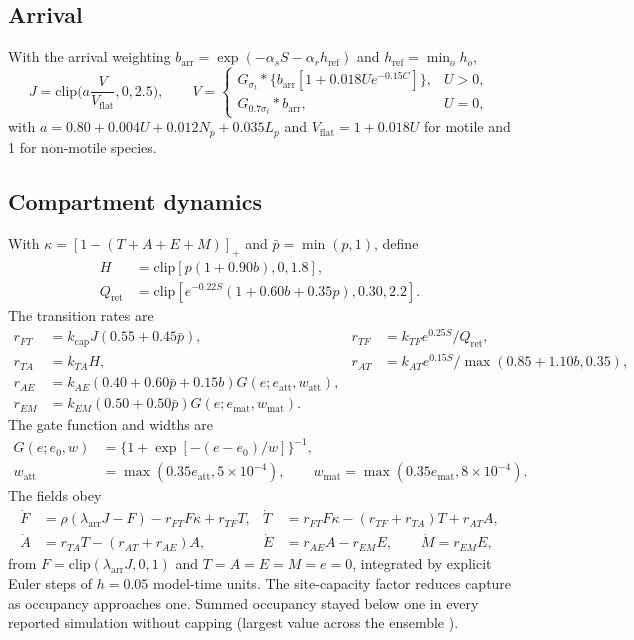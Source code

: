 \documentclass[11pt]{article}
\begin{document}
\subsection{Arrival}
With the arrival weighting $b_{\mathrm{arr}}=\exp(-\alpha_sS-\alpha_rh_{\mathrm{ref}})$ and $h_{\mathrm{ref}}=\min_oh_o$,
\begin{equation}
J=\mathrm{clip}\Big(a\frac{V}{V_{\mathrm{flat}}},0,2.5\Big),\qquad V=\begin{cases}G_{\sigma_t}\ast\{b_{\mathrm{arr}}[1+0.018U e^{-0.15C}]\},&U>0,\\G_{0.7\sigma_t}\ast b_{\mathrm{arr}},&U=0,\end{cases}
\end{equation}
with $a=0.80+0.004U+0.012N_p+0.035L_p$ and $V_{\mathrm{flat}}=1+0.018U$ for motile and 1 for non-motile species.

\subsection{Compartment dynamics}
With $\kappa=[1-(T+A+E+M)]_+$ and $\bar p=\min(p,1)$, define
\begin{align}
H &= \mathrm{clip}[p(1+0.90b),0,1.8],\\
Q_{\mathrm{ret}} &= \mathrm{clip}[e^{-0.22S}(1+0.60b+0.35p),0.30,2.2].
\end{align}
The transition rates are
\begin{align}
r_{FT}&=k_{\mathrm{cap}}J(0.55+0.45\bar p), & r_{TF}&=k_{TF}e^{0.25S}/Q_{\mathrm{ret}},\\
r_{TA}&=k_{TA}H, & r_{AT}&=k_{AT}e^{0.15S}/\max(0.85+1.10b,0.35),\\
r_{AE}&=k_{AE}(0.40+0.60\bar p+0.15b)G(e;e_{\mathrm{att}},w_{\mathrm{att}}),\\
r_{EM}&=k_{EM}(0.50+0.50\bar p)G(e;e_{\mathrm{mat}},w_{\mathrm{mat}}).
\end{align}
The gate function and widths are
\begin{align}
G(e;e_0,w)&=\{1+\exp[-(e-e_0)/w]\}^{-1},\\
w_{\mathrm{att}}&=\max(0.35e_{\mathrm{att}},5\times10^{-4}),\qquad
w_{\mathrm{mat}}=\max(0.35e_{\mathrm{mat}},8\times10^{-4}).
\end{align}
The fields obey
\begin{align}
\dot F&=\rho(\lambda_{\mathrm{arr}}J-F)-r_{FT}F\kappa+r_{TF}T, &\dot T&=r_{FT}F\kappa-(r_{TF}+r_{TA})T+r_{AT}A,\\
\dot A&=r_{TA}T-(r_{AT}+r_{AE})A, &\dot E&=r_{AE}A-r_{EM}E,\qquad\dot M=r_{EM}E,
\end{align}
from $F=\mathrm{clip}(\lambda_{\mathrm{arr}}J,0,1)$ and $T=A=E=M=e=0$, integrated by explicit Euler steps of $h=0.05$ model-time units. The site-capacity factor reduces capture as occupancy approaches one. Summed occupancy stayed below one in every reported simulation without capping (largest value across the ensemble \MaxOcc{}).
\end{document}
